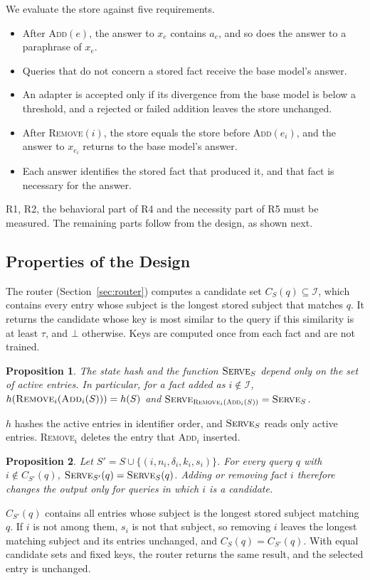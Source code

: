 \documentclass[journal,10pt]{IEEEtran}
\newtheorem{proposition}{Proposition}
\newcommand{\commit}{\textsc{Add}}
\newcommand{\revoke}{\textsc{Remove}}
\newcommand{\serve}{\textsc{Serve}}
\begin{document}
We evaluate the store against five requirements.
\begin{itemize}
\item[R1] After \commit$(e)$, the answer to $x_e$ contains $a_e$, and so does the answer
to a paraphrase of $x_e$.
\item[R2] Queries that do not concern a stored fact receive the base model's answer.
\item[R3] An adapter is accepted only if its divergence from the base model is below a
threshold, and a rejected or failed addition leaves the store unchanged.
\item[R4] After \revoke$(i)$, the store equals the store before \commit$(e_i)$, and the
answer to $x_{e_i}$ returns to the base model's answer.
\item[R5] Each answer identifies the stored fact that produced it, and that fact is
necessary for the answer.
\end{itemize}
R1, R2, the behavioral part of R4 and the necessity part of R5 must be measured. The
remaining parts follow from the design, as shown next.

\subsection{Properties of the Design}
\label{sec:props}

The router (Section~\ref{sec:router}) computes a candidate set
$C_S(q)\subseteq\mathcal{I}$, which contains every entry whose subject is the longest
stored subject that matches $q$. It returns the candidate whose key is most similar to
the query if this similarity is at least $\tau$, and $\bot$ otherwise. Keys are computed
once from each fact and are not trained.

\begin{proposition}\label{prop:identity}
The state hash and the function $\serve_S$ depend only on the set of active entries. In
particular, for a fact added as $i\notin\mathcal{I}$,
$h(\revoke_i(\commit_i(S)))=h(S)$ and $\serve_{\revoke_i(\commit_i(S))}=\serve_S$.
\end{proposition}
\begin{IEEEproof}
$h$ hashes the active entries in identifier order, and $\serve_S$ reads only active
entries. \revoke$_i$ deletes the entry that \commit$_i$ inserted.
\end{IEEEproof}

\begin{proposition}\label{prop:locality}
Let $S'=S\cup\{(i,n_i,\delta_i,k_i,s_i)\}$. For every query $q$ with $i\notin C_{S'}(q)$,
$\serve_{S'}(q)=\serve_S(q)$. Adding or removing fact $i$ therefore changes the output
only for queries in which $i$ is a candidate.
\end{proposition}
\begin{IEEEproof}
$C_{S'}(q)$ contains all entries whose subject is the longest stored subject matching
$q$. If $i$ is not among them, $s_i$ is not that subject, so removing $i$ leaves the
longest matching subject and its entries unchanged, and $C_S(q)=C_{S'}(q)$. With equal
candidate sets and fixed keys, the router returns the same result, and the selected
entry is unchanged.
\end{IEEEproof}
\end{document}
